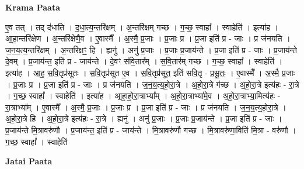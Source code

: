 \documentclass[17pt]{extarticle}
\begin{document}
\textbf{Krama Paata} \newline

ए॒व तत् । तद् द॑धाति । द॒धा॒त्य॒न्तरि॑क्षम् । अ॒न्तरि॑क्षम् गच्छ । ग॒च्छ॒ स्वाहा᳚ । स्वाहेति॑ । इत्या॑ह । आ॒हा॒न्तरि॑क्षेण । अ॒न्तरि॑क्षेणै॒व । ए॒वास्मै᳚ । अ॒स्मै॒ प्र॒जाः । प्र॒जाः प्र । प्र॒जा इति॑ प्र - जाः । प्र ज॑नयति । ज॒न॒य॒त्य॒न्तरि॑क्षम् । अ॒न्तरि॑क्षꣳ॒॒ हि । ह्यनु॑ । अनु॑ प्र॒जाः । प्र॒जाः प्र॒जाय॑न्ते । प्र॒जा इति॑ प्र - जाः । प्र॒जाय॑न्ते दे॒वम् । प्र॒जाय॑न्त॒ इति॑ प्र - जाय॑न्ते । दे॒वꣳ स॑वि॒तार᳚म् । स॒वि॒तार॑म् गच्छ । ग॒च्छ॒ स्वाहा᳚ । स्वाहेति॑ । इत्या॑ह । आ॒ह॒ स॒वि॒तृप्र॑सूतः । स॒वि॒तृप्र॑सूत ए॒व । स॒वि॒तृप्र॑सूत॒ इति॑ सवि॒तृ - प्र॒सू॒तः॒ । ए॒वास्मै᳚ । अ॒स्मै॒ प्र॒जाः । प्र॒जाः प्र । प्र॒जा इति॑ प्र - जाः । प्र ज॑नयति । ज॒न॒य॒त्य॒हो॒रा॒त्रे । अ॒हो॒रा॒त्रे ग॑च्छ । अ॒हो॒रा॒त्रे इत्य॑हः - रा॒त्रे । ग॒च्छ॒ स्वाहा᳚ । स्वाहेति॑ । इत्या॑ह । आ॒हा॒हो॒रा॒त्राभ्या᳚म् । अ॒हो॒रा॒त्राभ्या॑मे॒व । अ॒हो॒रा॒त्राभ्या॒मित्य॑हः - रा॒त्राभ्या᳚म् । ए॒वास्मै᳚ । अ॒स्मै॒ प्र॒जाः । प्र॒जाः प्र । प्र॒जा इति॑ प्र - जाः । प्र ज॑नयति । ज॒न॒य॒त्य॒हो॒रा॒त्रे । अ॒हो॒रा॒त्रे हि । अ॒हो॒रा॒त्रे इत्य॑हः - रा॒त्रे । ह्यनु॑ । अनु॑ प्र॒जाः । प्र॒जाः प्र॒जाय॑न्ते । प्र॒जा इति॑ प्र - जाः । प्र॒जाय॑न्ते मि॒त्रावरु॑णौ । प्र॒जाय॑न्त॒ इति॑ प्र - जाय॑न्ते । मि॒त्रावरु॑णौ गच्छ । मि॒त्रावरु॑णा॒विति॑ मि॒त्रा - वरु॑णौ । ग॒च्छ॒ स्वाहा᳚ । स्वाहेति॑ \newline

\textbf{Jatai Paata} \newline
\end{document}
